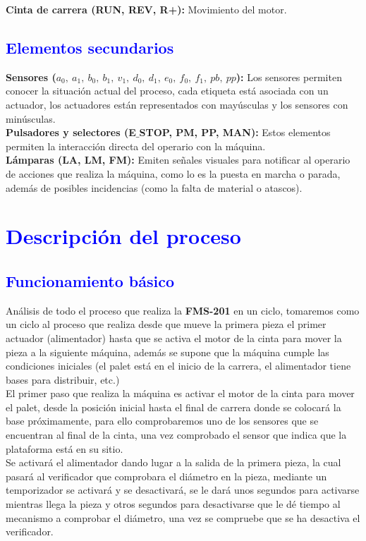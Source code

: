 \textbf{Cinta de carrera (RUN, REV, R+):} Movimiento del motor.
\subsection{\textcolor{blue}{Elementos secundarios}}

\textbf{Sensores ($a_0,\ a_1,\ b_0,\ b_1,\ v_1,\ d_0,\ d_1,\ e_0,\ f_0,\ f_1,\ pb,\ pp$):} Los sensores permiten conocer la situación actual del proceso, cada etiqueta está asociada con un actuador, los actuadores están representados con mayúsculas y los sensores con minúsculas.\\

\textbf{Pulsadores y selectores (E$\_$STOP, PM, PP, MAN):} Estos elementos permiten la interacción directa del operario con la máquina.\\

\textbf{Lámparas (LA, LM, FM):} Emiten señales visuales para notificar al operario de acciones que realiza la máquina, como lo es la puesta en marcha o parada, además de posibles incidencias (como la falta de material o atascos). 
\section{\textcolor{blue}{Descripción del proceso}}
\subsection{\textcolor{blue}{Funcionamiento básico}}

Análisis de todo el proceso que realiza la \textbf{FMS-201} en un ciclo, tomaremos como un ciclo al proceso que realiza desde que mueve la primera pieza el primer actuador (alimentador) hasta que se activa el motor de la cinta para mover la pieza a la siguiente máquina, además se supone que la máquina cumple las condiciones iniciales (el palet está en el inicio de la carrera, el alimentador tiene bases para distribuir, etc.)\\

El primer paso que realiza la máquina es activar el motor de la cinta para mover el palet, desde la posición inicial hasta el final de carrera donde se colocará la base próximamente, para ello comprobaremos uno de los sensores que se encuentran al final de la cinta, una vez comprobado el sensor que indica que la plataforma está en su sitio.\\

Se activará el alimentador dando lugar a la salida de la primera pieza, la cual pasará al verificador que comprobara el diámetro en la pieza, mediante un temporizador se activará y se desactivará, se le dará unos segundos para activarse mientras llega la pieza y otros segundos para desactivarse que le dé tiempo al mecanismo a comprobar el diámetro, una vez se compruebe que se ha desactiva el verificador.\\

